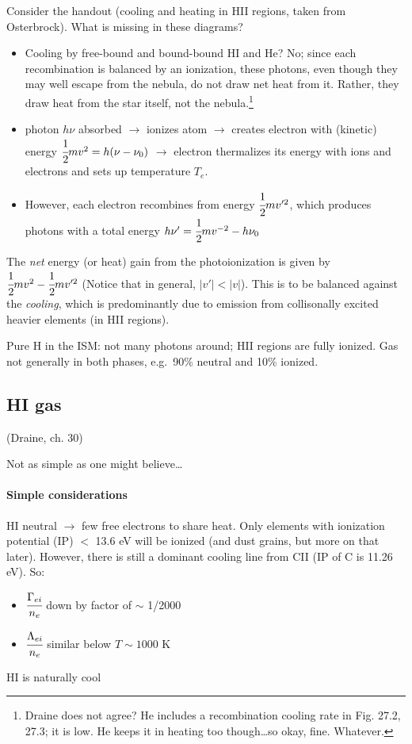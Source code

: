\documentclass[12pt]{article}
\newcommand{\mar}[1]{\hspace{0pt}\marginpar{-\textcolor{black}{#1}-}}
\newcommand{\mynotes}[1]{\textcolor{mygreen}{#1}}
\begin{document}
\mar{159}Consider the handout (cooling and heating in HII regions, taken from
Osterbrock). What is missing in these diagrams?
\begin{itemize}
    \item Cooling by free-bound and bound-bound HI and He?
        No; since each recombination is balanced by an ionization, these
        photons, even though they may well escape from the nebula, do
        not draw net heat from it. Rather, they draw heat from the star
        itself, not the nebula.\footnote{Draine does not agree? He includes
        a recombination cooling rate in Fig. 27.2, 27.3; it is low.
        He keeps it in heating too though\ldots so okay, fine. Whatever.}
    \item photon $h\nu$ absorbed
        $\rightarrow$
        ionizes atom
        $\rightarrow$
        creates electron with \mynotes{(kinetic)} energy
        $\cfrac{1}{2}mv^{2} = h(\nu - \nu_{0})  $
        $\rightarrow$
        electron thermalizes its energy with ions and electrons and
        sets up temperature $T_{e}$.
    \item However, each electron recombines from energy $\cfrac{1}{2}mv'^{2}$,
        which produces photons with a total energy
        $h\nu' = \cfrac{1}{2}mv^{-2} - h\nu_{0} $
\end{itemize}
The \emph{net} energy (or heat) gain from the photoionization is given by
$ \cfrac{1}{2}mv^{2} - \cfrac{1}{2}mv'^{2} $
(Notice that in general, $|v'| < |v|$).
This is to be balanced against the \emph{cooling}, which is predominantly
due to emission from collisonally excited heavier elements
(in HII regions).

\mynotes{Pure H in the ISM: not many photons around; HII regions are fully
ionized. Gas not generally in both phases, e.g.\ 90\% neutral and 10\% ionized.}

\subsection{HI gas}\mar{160}
(Draine, ch. 30)

Not as simple as one might believe\ldots
\paragraph{Simple considerations}
HI neutral $\rightarrow$ few free electrons to share heat.
Only elements with ionization potential (IP) $<$ 13.6 eV will be
ionized (and dust grains, but more on that later).
However, there is still a dominant cooling line from CII
(IP of C is 11.26 eV). So:
\begin{itemize}
    \item $\cfrac{\Gamma_{ei}}{n_{e}} $ down by factor of $\sim$ 1/2000
    \item $\cfrac{\Lambda_{ei}}{n_{e}} $ similar below $T \sim 1000$ K
\end{itemize}
HI is naturally cool
\end{document}

